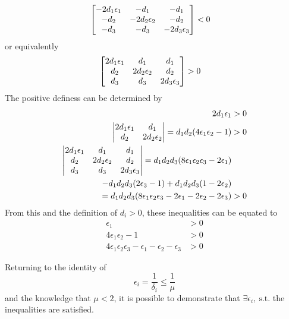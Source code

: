 \documentclass[letter]{article}
\begin{document}
\begin{align}
	\mqty[-2 d_1\epsilon_1 & -d_1 &-d_1\\
	-d_2 &-2 d_2\epsilon_2 &-d_2\\
	-d_3	&-d_3	&-2 d_3\epsilon_3]
	&< 0
\end{align}
or equivalently
\begin{align}
	\mqty[2 d_1\epsilon_1 & d_1 &d_1\\
	d_2 &2 d_2\epsilon_2 &d_2\\
	d_3	&d_3	&2 d_3\epsilon_3]
	&> 0
\end{align}
The positive definess can be determined by
\begin{align}
	2 d_1 \epsilon_1 &>0\\
	\mqty|2 d_1\epsilon_1 & d_1\\
	d_2 &2 d_2\epsilon_2| = d_1 d_2 (4 \epsilon_1 \epsilon_2 - 1) &> 0\\
	\mqty|2 d_1\epsilon_1 & d_1 &d_1\\
	d_2 &2 d_2\epsilon_2 &d_2\\
	d_3	&d_3	&2 d_3\epsilon_3|
	= d_1 d_2 d_3  (8 \epsilon_1 \epsilon_2 \epsilon_3 - 2 \epsilon_1)\nonumber\\
	- d_1 d_2 d_3(2 \epsilon_3 - 1)
	+ d_1 d_2 d_3 (1 - 2\epsilon_2)\nonumber\\
	= d_1 d_2 d_3 (8 \epsilon_1 \epsilon_2 \epsilon_3 
	- 2 \epsilon_1
	- 2 \epsilon_2
	- 2 \epsilon_3)
	&>0
\end{align}
From this and the definition of $d_i > 0$, these inequalities can be equated to
\begin{align}
	\epsilon_1&>0\\
	4 \epsilon_1 \epsilon_2 -1 &>0\\
	4 \epsilon_1 \epsilon_2 \epsilon_3 - \epsilon_1 - \epsilon_2 - \epsilon_3 &> 0	
\end{align}


Returning to the identity of $$\epsilon_i = \frac{1}{\delta_i} \leq \frac{1}{\mu}$$ and the knowledge that $\mu < 2$,
it is possible to demonstrate that $\exists \epsilon_i, \ \text{s.t.}$ the inequalities are satisfied.


%
%
\end{document}
